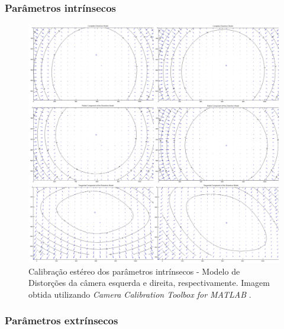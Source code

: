 \subsubsection{Parâmetros intrínsecos}

\begin{figure}[H]
 	\centering
 	\includegraphics[scale=0.20]{./Resources/distortion/lenses_distortion.jpg}
 	\caption{Calibração estéreo dos parâmetros intrínsecos - Modelo de Distorções da câmera esquerda e direita, respectivamente. Imagem obtida utilizando \textit{Camera Calibration Toolbox for MATLAB} \cite{Bouguet1999}.}
 	\label{lenses_distortion}
\end{figure}


\subsubsection{Parâmetros extrínsecos}

